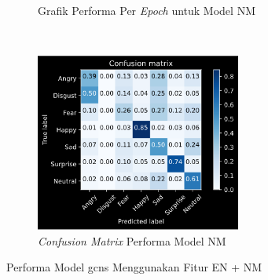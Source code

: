 \begin{figure}[t]
\begin{subfigure}[t]{6.75cm}
        \caption{Grafik Performa Per \textit{Epoch} untuk Model NM}
        \label{fig:grafikeksperimen4b12}
    \end{subfigure}
    ~~~
    \begin{subfigure}[t]{6.75cm}
        \includegraphics[width=6.75cm]{gambar/eksperimen4b1_matriks2.png}
        \caption{\textit{Confusion Matrix} Performa Model NM}
        \label{fig:confusionmatrixeksperimen4b12}
    \end{subfigure}
    \caption{Performa Model \acrshort{gcns} Menggunakan Fitur EN + NM}
    \label{fig:hasileksperimen4b1}
\end{figure}
